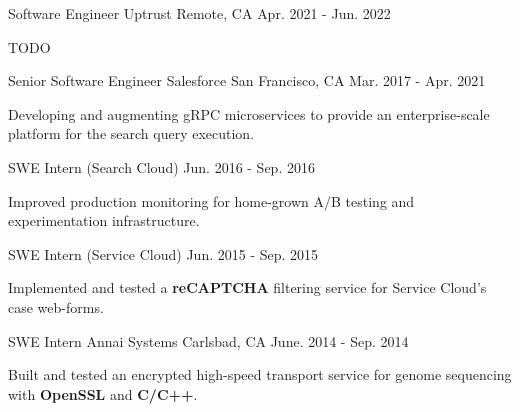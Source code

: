 
\begin{cventries}

  \cventry
    {Software Engineer} %
    {Uptrust} %
    {Remote, CA} %
    {Apr. 2021 - Jun. 2022} %
    {
      \begin{cvitems} %
        \item {TODO}
      \end{cvitems}
    }
    
  \cventry
    {Senior Software Engineer} %
    {Salesforce} %
    {San Francisco, CA} %
    {Mar. 2017 - Apr. 2021} %
    {
      \begin{cvitems} %
        \item {Developing and augmenting gRPC microservices to provide an enterprise-scale platform for the search query execution.}
      \end{cvitems}
    }
    
  \cventry
    {SWE Intern (Search Cloud)} %
    {} %
    {} %
    {Jun. 2016 - Sep. 2016} %
    {
      \begin{cvitems} %
        \item {Improved production monitoring for home-grown A/B testing and experimentation infrastructure.}
      \end{cvitems}
    }
    
  \cventry
    {SWE Intern (Service Cloud)} %
    {} %
    {} %
    {Jun. 2015 - Sep. 2015} %
    {
      \begin{cvitems} %
        \item {Implemented and tested a \textbf{reCAPTCHA} filtering service for Service Cloud’s case web-forms.}
      \end{cvitems}
    }
    
  \cventry
    {SWE Intern} %
    {Annai Systems} %
    {Carlsbad, CA} %
    {June. 2014 - Sep. 2014} %
    {
      \begin{cvitems} %
        \item {Built and tested an encrypted high-speed transport service for genome sequencing with \textbf{OpenSSL} and \textbf{C/C++}.}
      \end{cvitems}
    }
    
\end{cventries}
